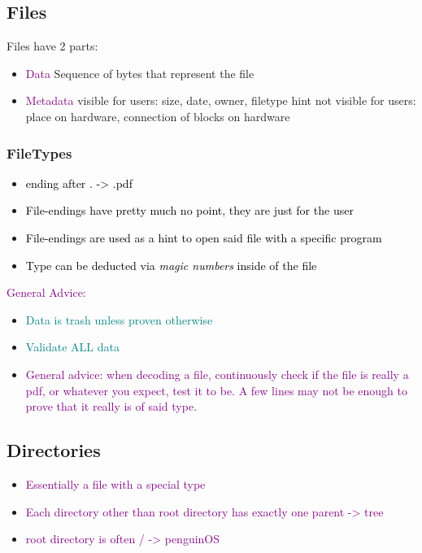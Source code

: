 \documentclass[main.tex,fontsize=8pt,paper=a4,paper=portrait,DIV=calc,]{scrartcl}
\begin{document}
\subsection{Files}
Files have 2 parts: 
\begin{itemize}
\item \textcolor{purple}{Data}\newline
  Sequence of bytes that represent the file
\item \textcolor{purple}{Metadata}\newline
  visible for users: size, date, owner, filetype hint\newline
  not visible for users: place on hardware, connection of blocks on hardware
\end{itemize} 

\subsubsection{FileTypes}
\begin{itemize}
\item \textcolor{black}{ending after . -> .pdf}
\item \textcolor{black}{File-endings have pretty much no point, they are just for the user}
\item \textcolor{black}{File-endings are used as a hint to open said file with a specific program}
\item \textcolor{black}{Type can be deducted via \emph{magic numbers} inside of the file}
\end{itemize} 
\textcolor{purple}{General Advice:}
\begin{itemize}
\item \textcolor{teal}{Data is trash unless proven otherwise}
\item \textcolor{teal}{Validate ALL data}
\item \textcolor{purple}{General advice: when decoding a file, continuously check if the file is really a pdf, or whatever you expect, test it to be. \newline
A few lines may not be enough to prove that it really is of said type.}
\end{itemize} 

\subsection{Directories}
\begin{itemize}
\item \textcolor{purple}{Essentially a file with a special type}
\item \textcolor{purple}{Each directory other than root directory has exactly one parent -> tree}
\item \textcolor{purple}{root directory is often / -> penguinOS}
\end{itemize} 
\end{document}
